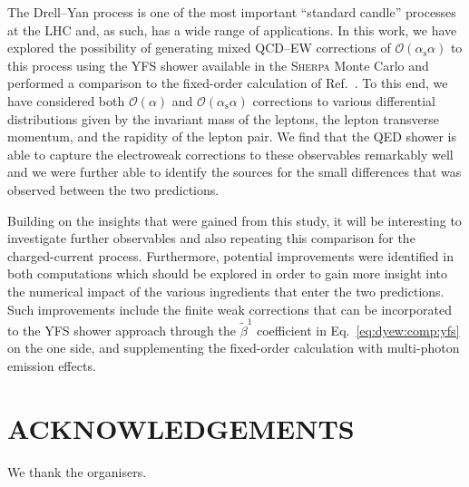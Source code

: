 \documentclass[11pt]{cernrep}
\newcommand{\order}{\ensuremath{\mathcal{O}}}
\newcommand{\alphas}{\ensuremath{\alpha_\mathrm{s}}}
\begin{document}
The Drell--Yan process is one of the most important ``standard candle'' processes at the LHC and, as such, has a wide range of applications.
In this work, we have explored the possibility of generating mixed QCD--EW corrections of $\order(\alphas\alpha)$ to this process using the YFS shower available in the \textsc{Sherpa} Monte Carlo and performed a comparison to the fixed-order calculation of Ref.~\cite{Dittmaier:2015rxo}.
To this end, we have considered both $\order(\alpha)$ and $\order(\alphas\alpha)$ corrections to various differential distributions given by the invariant mass of the leptons, the lepton transverse momentum, and the rapidity of the lepton pair.
We find that the QED shower is able to capture the electroweak corrections to these observables remarkably well and we were further able to identify the sources for the small differences that was observed between the two predictions.

Building on the insights that were gained from this study, it will be interesting to investigate further observables and also repeating this comparison for the charged-current process.
Furthermore, potential improvements were identified in both computations which should be explored in order to gain more insight into the numerical impact of the various ingredients that enter the two predictions. 
Such improvements include the finite weak corrections that can be incorporated to the YFS shower approach through the $\tilde{\beta}^1$ coefficient in Eq.~\eqref{eq:dyew:comp:yfs} on the one side, and supplementing the fixed-order calculation with multi-photon emission effects. 


\section*{ACKNOWLEDGEMENTS}

We thank the organisers.


\end{document}

